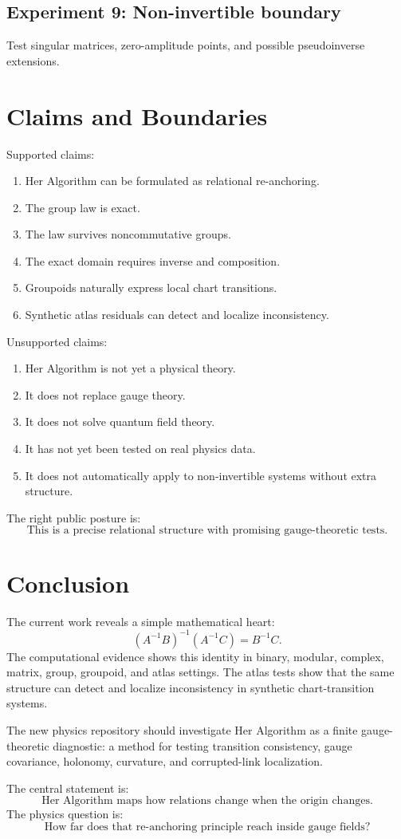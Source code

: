 \documentclass[11pt]{article}
\newcommand{\HA}{Her Algorithm}
\begin{document}
\subsection{Experiment 9: Non-invertible boundary}
Test singular matrices, zero-amplitude points, and possible pseudoinverse extensions.

\section{Claims and Boundaries}

Supported claims:
\begin{enumerate}[leftmargin=1.5em]
\item \HA{} can be formulated as relational re-anchoring.
\item The group law is exact.
\item The law survives noncommutative groups.
\item The exact domain requires inverse and composition.
\item Groupoids naturally express local chart transitions.
\item Synthetic atlas residuals can detect and localize inconsistency.
\end{enumerate}

Unsupported claims:
\begin{enumerate}[leftmargin=1.5em]
\item \HA{} is not yet a physical theory.
\item It does not replace gauge theory.
\item It does not solve quantum field theory.
\item It has not yet been tested on real physics data.
\item It does not automatically apply to non-invertible systems without extra structure.
\end{enumerate}

The right public posture is:
\[
\boxed{\text{This is a precise relational structure with promising gauge-theoretic tests.}}
\]

\section{Conclusion}

The current work reveals a simple mathematical heart:
\[
(A^{-1}B)^{-1}(A^{-1}C)=B^{-1}C.
\]
The computational evidence shows this identity in binary, modular, complex, matrix, group, groupoid, and atlas settings. The atlas tests show that the same structure can detect and localize inconsistency in synthetic chart-transition systems.

The new physics repository should investigate \HA{} as a finite gauge-theoretic diagnostic: a method for testing transition consistency, gauge covariance, holonomy, curvature, and corrupted-link localization.

The central statement is:
\[
\boxed{\text{\HA{} maps how relations change when the origin changes.}}
\]
The physics question is:
\[
\boxed{\text{How far does that re-anchoring principle reach inside gauge fields?}}
\]



\end{document}
